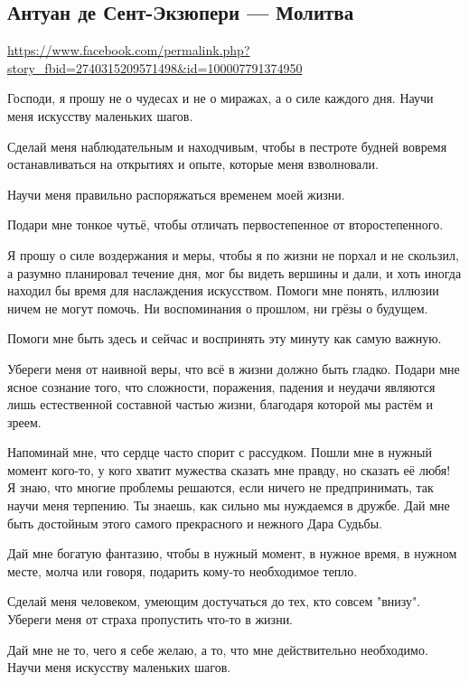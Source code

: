  
 

\subsection{Антуан де Сент-Экзюпери --- Молитва}
\label{sec:11_10_2020.news.fb.ana_gimmiri.1}

\url{https://www.facebook.com/permalink.php?story_fbid=2740315209571498&id=100007791374950}

Господи, я прошу не о чудесах и не о миражах, а о силе каждого дня.  Научи меня
искусству маленьких шагов.

Сделай меня наблюдательным и находчивым, чтобы в пестроте будней вовремя
останавливаться на открытиях и опыте, которые меня взволновали.

Научи меня правильно распоряжаться временем моей жизни.

Подари мне тонкое чутьё, чтобы отличать первостепенное от второстепенного.

Я прошу о силе воздержания и меры, чтобы я по жизни не порхал и не скользил, а
разумно планировал течение дня, мог бы видеть вершины и дали, и хоть иногда
находил бы время для наслаждения искусством.  Помоги мне понять, иллюзии ничем
не могут помочь. Ни воспоминания о прошлом, ни грёзы о будущем.

Помоги мне быть здесь и сейчас и воспринять эту минуту как самую важную.

Убереги меня от наивной веры, что всё в жизни должно быть гладко.  Подари мне
ясное сознание того, что сложности, поражения, падения и неудачи являются лишь
естественной составной частью жизни, благодаря которой мы растём и зреем.

Напоминай мне, что сердце часто спорит с рассудком.  Пошли мне в нужный момент
кого-то, у кого хватит мужества сказать мне правду, но сказать её любя!  Я
знаю, что многие проблемы решаются, если ничего не предпринимать, так научи
меня терпению.  Ты знаешь, как сильно мы нуждаемся в дружбе. Дай мне быть
достойным этого самого прекрасного и нежного Дара Судьбы.

Дай мне богатую фантазию, чтобы в нужный момент, в нужное время, в нужном месте, молча или говоря, подарить кому-то необходимое тепло.

Сделай меня человеком, умеющим достучаться до тех, кто совсем "внизу".  Убереги
меня от страха пропустить что-то в жизни.

Дай мне не то, чего я себе желаю, а то, что мне действительно необходимо.
Научи меня искусству маленьких шагов.
